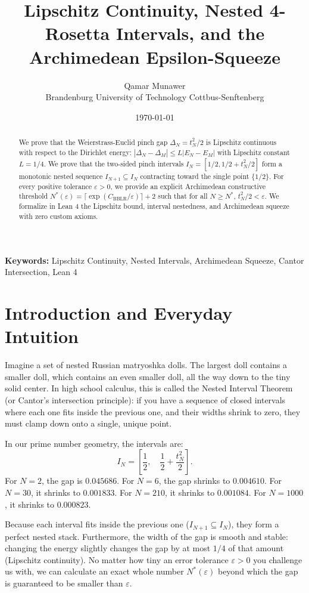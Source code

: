 \documentclass[11pt,a4paper]{article}
\title{\textbf{Lipschitz Continuity, Nested 4-Rosetta Intervals, and the Archimedean Epsilon-Squeeze}}
\author{Qamar Munawer \\ Brandenburg University of Technology Cottbus-Senftenberg}
\date{\today}
\theoremstyle{definition}
\begin{document}
\maketitle

\begin{abstract}
We prove that the Weierstrass-Euclid pinch gap $\Delta_N = t_N^2 / 2$ is Lipschitz continuous with respect to the Dirichlet energy: $|\Delta_N - \Delta_M| \le L |E_N - E_M|$ with Lipschitz constant $L = 1/4$. We prove that the two-sided pinch intervals $I_N = [1/2, 1/2 + t_N^2 / 2]$ form a monotonic nested sequence $I_{N+1} \subseteq I_N$ contracting toward the single point $\{1/2\}$. For every positive tolerance $\varepsilon > 0$, we provide an explicit Archimedean constructive threshold $N^*(\varepsilon) = \lceil \exp(C_{\mathrm{BBLR}} / \varepsilon) \rceil + 2$ such that for all $N \ge N^*$, $t_N^2 / 2 < \varepsilon$. We formalize in Lean 4 the Lipschitz bound, interval nestedness, and Archimedean squeeze with zero custom axioms.
\end{abstract}

\vspace{1em}
\noindent\textbf{Keywords:} Lipschitz Continuity, Nested Intervals, Archimedean Squeeze, Cantor Intersection, Lean 4

\section{Introduction and Everyday Intuition}

Imagine a set of nested Russian matryoshka dolls. The largest doll contains a smaller doll, which contains an even smaller doll, all the way down to the tiny solid center. In high school calculus, this is called the Nested Interval Theorem (or Cantor's intersection principle): if you have a sequence of closed intervals where each one fits inside the previous one, and their widths shrink to zero, they must clamp down onto a single, unique point.

In our prime number geometry, the intervals are:
\begin{equation}
I_N = \left[\frac{1}{2}, \quad \frac{1}{2} + \frac{t_N^2}{2}\right].
\end{equation}
For $N = 2$, the gap is $0.045686$.
For $N = 6$, the gap shrinks to $0.004610$.
For $N = 30$, it shrinks to $0.001833$.
For $N = 210$, it shrinks to $0.001084$.
For $N = 1000$, it shrinks to $0.000823$.

Because each interval fits inside the previous one ($I_{N+1} \subseteq I_N$), they form a perfect nested stack. Furthermore, the width of the gap is smooth and stable: changing the energy slightly changes the gap by at most $1/4$ of that amount (Lipschitz continuity). No matter how tiny an error tolerance $\varepsilon > 0$ you challenge us with, we can calculate an exact whole number $N^*(\varepsilon)$ beyond which the gap is guaranteed to be smaller than $\varepsilon$.
\end{document}

